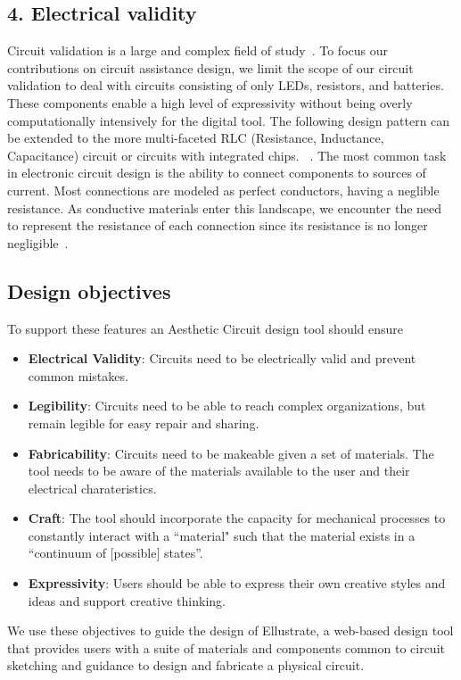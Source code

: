 \documentclass{sigchi}
\begin{document}
\subsection{4. Electrical validity}
  Circuit validation is a large and complex field of study~\cite{Patra:2007vo}. To focus our contributions on circuit assistance design, we limit the scope of our circuit validation to deal with circuits consisting of only LEDs, resistors, and batteries. These components enable a high level of expressivity without being overly computationally intensively for the digital tool. The following design pattern can be extended to the more multi-faceted RLC (Resistance, Inductance, Capacitance) circuit or circuits with integrated chips. ~\cite{mellis_microcontrollers_2013}.
  The most common task in electronic circuit design is the ability to connect components to sources of current. Most connections are modeled as perfect conductors, having a neglible resistance. As conductive materials enter this landscape, we encounter the need to represent the resistance of each connection since its resistance is no longer negligible~\cite{Buechley:2012ju}. 

\subsection{Design objectives}
  To support these features an Aesthetic Circuit design tool should ensure 
    \begin{itemize}
        \item {\bf Electrical Validity}: Circuits need to be electrically valid and prevent common mistakes.
        \item {\bf Legibility}: Circuits need to be able to reach complex organizations, but remain legible for easy repair and sharing.
        \item {\bf Fabricability}: Circuits need to be makeable given a set of materials. The tool needs to be aware of the materials available to the user and their electrical charateristics. 
        \item {\bf Craft}: The tool should incorporate the capacity for mechanical processes to constantly interact with a ``material"  such that the material exists in a ``continuum of [possible] states''\cite{mccullough1998abstracting}. 
        \item {\bf Expressivity}: Users should be able to express their own creative styles and ideas and support creative thinking. 
    \end{itemize}
We use these objectives to guide the design of Ellustrate, a web-based design tool that provides users with a suite of materials and components common to circuit sketching and guidance to design and fabricate a physical circuit.
\end{document}
